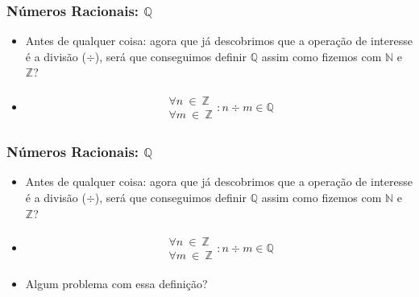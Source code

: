 \documentclass[usenames,dvipsnames,svgnames]{beamer}
\begin{document}
\begin{frame}
	
	\frametitle{Números Racionais: $\mathbb{Q}$}

	\begin{itemize}
		\item Antes de qualquer coisa: agora que já descobrimos que a operação de interesse é a divisão ($\div$), será que conseguimos definir $\mathbb{Q}$ assim como fizemos com $\mathbb{N}$ e $\mathbb{Z}$?
		\item
		\begin{equation}
		\begin{aligned}
			\substack{\forall n ~\in~ \mathbb{Z} \\ \forall m ~\in~ \mathbb{Z}}: n \div m \in \mathbb{Q}
		\end{aligned}
		\end{equation}
	\end{itemize}

\end{frame}

\begin{frame}
	
	\frametitle{Números Racionais: $\mathbb{Q}$}

	\begin{itemize}
		\item Antes de qualquer coisa: agora que já descobrimos que a operação de interesse é a divisão ($\div$), será que conseguimos definir $\mathbb{Q}$ assim como fizemos com $\mathbb{N}$ e $\mathbb{Z}$?
		\item
		\begin{equation}
		\begin{aligned}
			\substack{\forall n ~\in~ \mathbb{Z} \\ \forall m ~\in~ \mathbb{Z}}: n \div m \in \mathbb{Q}
		\end{aligned}
		\end{equation}
		\item Algum problema com essa definição?
	\end{itemize}

\end{frame}
\end{document}
